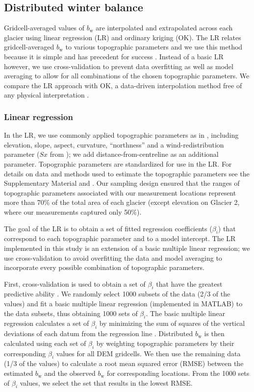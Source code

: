 \documentclass[twocolumn, letterpaper]{igs}
\begin{document}
\subsection{Distributed winter balance}

Gridcell-averaged values of $b_\mathrm{w}$ are interpolated and extrapolated across each glacier using linear regression (LR) and ordinary kriging (OK). The LR relates gridcell-averaged $b_\mathrm{w}$ to various topographic parameters and we use this method because it is simple and has precedent for success \citep[e.g.][]{McGrath2015}. Instead of a basic LR however, we use cross-validation to prevent data overfitting as well as model averaging to allow for all combinations of the chosen topographic parameters. We compare the LR approach with OK, a data-driven interpolation method free of any physical interpretation \citep[e.g.][]{Hock1999}.

\subsubsection{Linear regression}

In the LR, we use commonly applied topographic parameters as in \cite{McGrath2015}, including elevation, slope, aspect, curvature, ``northness'' and a wind-redistribution parameter ($Sx$ from \cite{Winstral2002}); we add distance-from-centreline as an additional parameter. Topographic parameters are standardized for use in the LR. For details on data and methods used to estimate the topographic parameters see the Supplementary Material and \cite{Pulwicki2017}. Our sampling design ensured that the ranges of topographic parameters associated with our measurement locations represent more than 70\% of the total area of each glacier (except elevation on Glacier 2, where our measurements captured only 50\%). 

The goal of the LR is to obtain a set of fitted regression coefficients ($\beta_i$) that correspond to each topographic parameter and to a model intercept. The LR implemented in this study is an extension of a basic multiple linear regression; we use cross-validation to avoid overfitting the data and model averaging to incorporate every possible combination of topographic parameters. 

First, cross-validation is used to obtain a set of $\beta_i$ that have the greatest predictive ability \citep{Kohavi1995}. We randomly select 1000 subsets of the data (2/3 of the values) and fit a basic multiple linear regression (implemented in MATLAB) to the data subsets, thus obtaining 1000 sets of $\beta_i$. The basic multiple linear regression calculates a set of $\beta_i$ by minimizing the sum of squares of the vertical deviations of each datum from the regression line \citep{Davis1986}. Distributed $b_\mathrm{w}$ is then calculated using each set of $\beta_i$ by weighting topographic parameters by their corresponding $\beta_i$ values for all DEM gridcells. We then use the remaining data (1/3 of the values) to calculate a root mean squared error (RMSE) between the estimated $b_\mathrm{w}$ and the observed $b_\mathrm{w}$ for corresponding locations. From the 1000 sets of $\beta_i$ values, we select the set that results in the lowest RMSE. 
\end{document}
